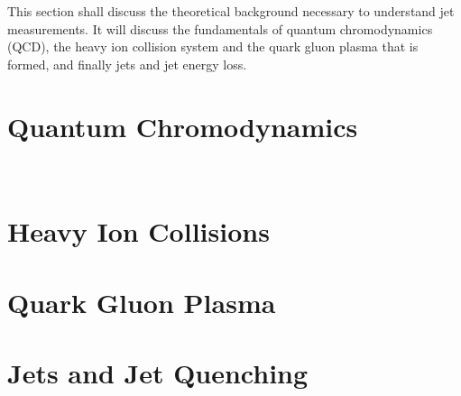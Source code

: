 This section shall discuss the theoretical background necessary to understand jet measurements. It will discuss the fundamentals of quantum chromodynamics (QCD), the heavy ion collision system and the quark gluon plasma that is formed, and finally jets and jet energy loss. 

\section{Quantum Chromodynamics}
\label{sec:qcd}

\
\section{Heavy Ion Collisions}
\label{sec:HICollisions}


\section{Quark Gluon Plasma}
\label{sec:qgp}


\section{Jets and Jet Quenching}
\label{sec:jets}

